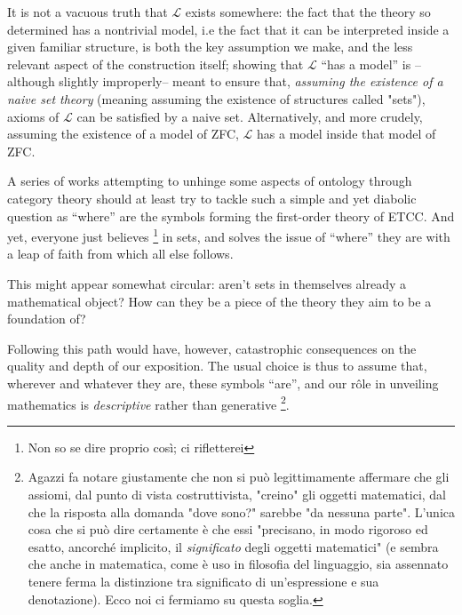 \documentclass[a4paper, 11pt]{article}
\begin{document}
	It is not a vacuous truth that $\mathcal{L}$ exists somewhere: the fact that the theory so determined has a nontrivial model, i.e the fact that it can be interpreted inside a given familiar structure, is both the key assumption we make, and the less relevant aspect of the construction itself; showing that $\mathcal{L}$ ``has a model'' is --although slightly improperly-- meant to ensure that, \emph{assuming the existence of a naive set theory} (meaning assuming the existence of structures called "sets"), axioms of $\mathcal{L}$ can be satisfied by a naive set. Alternatively, and more crudely, assuming the existence of a model of ZFC, $\mathcal{L}$ has a model inside that model of ZFC. 
	
	A series of works attempting to unhinge some aspects of ontology through category theory should at least try to tackle such a simple and yet diabolic question as ``where'' are the symbols forming the first-order theory of ETCC. And yet, everyone just believes \footnote{Non so se dire proprio così; ci rifletterei} in sets, and solves the issue of ``where'' they are with a leap of faith from which all else follows.
	
	This might appear somewhat circular: aren't sets in themselves already a mathematical object? How can they be a piece of the theory they aim to be a foundation of?
	
	Following this path would have, however, catastrophic consequences on the quality and depth of our exposition. The usual choice is thus to assume that, wherever and whatever they are, these symbols ``are'', and our r\^ole in unveiling mathematics is \emph{descriptive} rather than generative \footnote{Agazzi fa notare giustamente che non si può legittimamente affermare che gli assiomi, dal punto di vista costruttivista, "creino" gli oggetti matematici, dal che la risposta alla domanda "dove sono?" sarebbe "da nessuna parte". L'unica cosa che si può dire certamente è che essi "precisano, in modo rigoroso ed esatto, ancorché implicito, il \emph{significato} degli oggetti matematici" (e sembra che anche in matematica, come è uso in filosofia del linguaggio, sia assennato tenere ferma la distinzione tra significato di un'espressione e sua denotazione). Ecco noi ci fermiamo su questa soglia. \endfo}.
	
\end{document}
